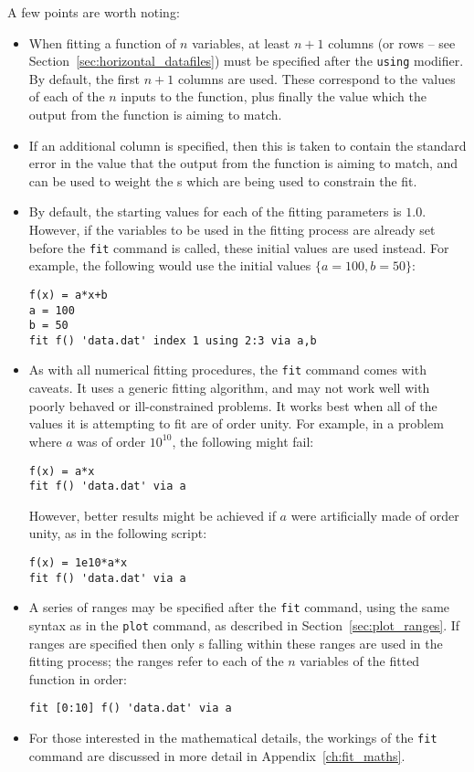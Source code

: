 A few points are worth noting:

\begin{itemize}
\item When fitting a function of $n$ variables, at least $n+1$ columns (or
rows -- see Section~\ref{sec:horizontal_datafiles}) must be specified after the
{\tt using} modifier. By default, the first $n+1$ columns are used. These
correspond to the values of each of the $n$ inputs to the function, plus
finally the value which the output from the function is aiming to match.
\item If an additional column is specified, then this is taken to contain the
standard error in the value that the output from the function is aiming to
match, and can be used to weight the \datapoint s which are being used to
constrain the fit.
\item By default, the starting values for each of the fitting parameters is
$1.0$. However, if the variables to be used in the fitting process are already
set before the {\tt fit} command is called, these initial values are used
instead. For example, the following would use the initial values
$\{a=100,b=50\}$:
\begin{verbatim}
f(x) = a*x+b
a = 100
b = 50
fit f() 'data.dat' index 1 using 2:3 via a,b
\end{verbatim}

\item As with all numerical fitting procedures, the {\tt fit} command comes
with caveats. It uses a generic fitting algorithm, and may not work well with
poorly behaved or ill-constrained problems. It works best when all of the
values it is attempting to fit are of order unity. For example, in a problem
where $a$ was of order $10^{10}$, the following might fail:
\begin{verbatim}
f(x) = a*x
fit f() 'data.dat' via a
\end{verbatim}
However, better results might be achieved if $a$ were artificially made of
order unity, as in the following script:
\begin{verbatim}
f(x) = 1e10*a*x
fit f() 'data.dat' via a
\end{verbatim}

\item A series of ranges may be specified after the {\tt fit} command, using
the same syntax as in the {\tt plot} command, as described in
Section~\ref{sec:plot_ranges}. If ranges are specified then only \datapoint s
falling within these ranges are used in the fitting process; the ranges refer
to each of the $n$ variables of the fitted function in order:
\begin{verbatim}
fit [0:10] f() 'data.dat' via a
\end{verbatim}

\item For those interested in the mathematical details, the workings of the
{\tt fit} command are discussed in more detail in Appendix~\ref{ch:fit_maths}.

\end{itemize}

